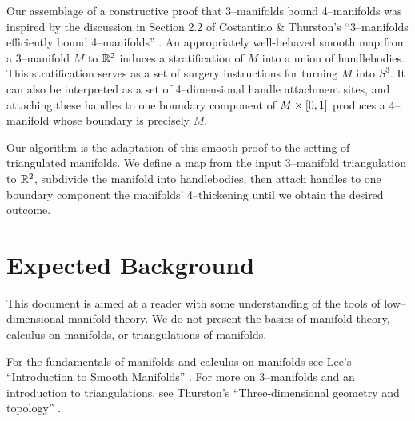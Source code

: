 %

Our assemblage of a constructive proof that 3--manifolds bound 4--manifolds was inspired by the discussion in Section 2.2 of Costantino \& Thurston's ``3--manifolds efficiently bound 4--manifolds'' \cite{CostThur08}.
An appropriately well-behaved smooth map from a 3--manifold $M$ to $\mathbb{R}^2$ induces a stratification of $M$ into a union of handlebodies.
This stratification serves as a set of surgery instructions for turning $M$ into $S^3$.
It can also be interpreted as a set of 4--dimensional handle attachment sites, and attaching these handles to one boundary component of $M\times[0,1]$ produces a 4--manifold whose boundary is precisely $M$.

Our algorithm is the adaptation of this smooth proof to the setting of triangulated manifolds.
We define a map from the input 3--manifold triangulation to $\mathbb{R}^2$, subdivide the manifold into handlebodies, then attach handles to one boundary component the manifolds' 4--thickening until we obtain the desired outcome.

\section{Expected Background}

This document is aimed at a reader with some understanding of the tools of low--dimensional manifold theory.
We do not present the basics of manifold theory, calculus on manifolds, or triangulations of manifolds.

For the fundamentals of manifolds and calculus on manifolds see Lee's ``Introduction to Smooth Manifolds'' \cite{Lee00}.
For more on 3--manifolds and an introduction to triangulations, see Thurston's ``Three-dimensional geometry and topology'' \cite{thurston1979geometry}.

